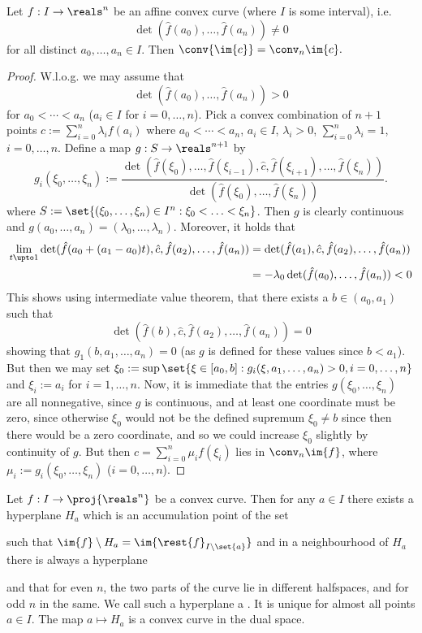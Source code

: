 \begin{lemma}
    Let $f:I\to\reals^n$ be an affine convex curve (where $I$ is some interval), i.e.
    $$
    \det(\hat{f}(a_0),\ldots,\hat{f}(a_n)) \neq 0
    $$
    for all distinct $a_0,\ldots,a_n\in I$. Then $\conv{\im{c}}=\conv_n{\im{c}}.$
\end{lemma}

\begin{proof}
    W.l.o.g. we may assume that
    $$
    \det(\hat{f}(a_0),\ldots,\hat{f}(a_n))>0
    $$
    for $a_0 < \cdots < a_n$ ($a_i\in I$ for $i=0,\ldots,n$).
    Pick a convex combination of $n+1$ points $c:=\sum_{i=0}^n{\lambda_i f(a_i)}$ where $a_0 < \cdots <a_n$, $a_i\in I$, $\lambda_i>0$, $\sum_{i=0}^n{\lambda_i}=1$, $i=0,\ldots,n$. Define a map $g:S\to\reals^{n+1}$ by
        $$ g_i(\xi_0,\ldots,\xi_n):=\frac{\det(\hat{f}(\xi_0),\ldots,\hat{f}(\xi_{i-1}),\hat{c},\hat{f}(\xi_{i+1}),\ldots,\hat{f}(\xi_n))}{\det(\hat{f}(\xi_0),\ldots,\hat{f}(\xi_n))}.
        $$
        where $S:=\set{(\xi_0,\ldots,\xi_n)\in I^n:\xi_0<\ldots<\xi_n}$.
        Then $g$ is clearly continuous and $g(a_0,\ldots,a_n)=(\lambda_0,\ldots,\lambda_n)$.
        Moreover, it holds that
        \begin{align*}
            \lim_{t\upto 1}{\det(\hat{f}(a_0+(a_1-a_0)t),\hat{c},\hat{f}(a_2),\ldots,\hat{f}(a_n))}
            &=\det(\hat{f}(a_1),\hat{c},\hat{f}(a_2),\ldots,\hat{f}(a_n))\\
            &= -\lambda_0\det(\hat{f}(a_0),\ldots,\hat{f}(a_n))<0
        \end{align*}
        This shows using intermediate value theorem, that there exists a $b\in(a_0,a_1)$ such that
        $$\det(\hat{f}(b),\hat{c},\hat{f}(a_2),\ldots,\hat{f}(a_n))=0$$
        showing that $g_1(b,a_1,\ldots,a_n)=0$ (as $g$ is defined for these values since $b<a_1$).
        But then we may set $\xi_0:=\sup\set{\xi\in[a_0,b]:g_i(\xi,a_1,\ldots,a_n) > 0,i=0,\ldots,n}$ and $\xi_i:=a_i$ for $i=1,\ldots,n$.
        Now, it is immediate that the entries $g(\xi_0,\ldots,\xi_n)$ are all nonnegative, since $g$ is continuous, and at least one coordinate must be zero, since otherwise $\xi_0$ would not be the defined supremum $\xi_0\neq b$ since then there would be a zero coordinate, and so we could increase $\xi_0$ slightly by continuity of $g$.
        But then $c=\sum_{i=0}^n{\mu_i f(\xi_i)}$ lies in $\conv_n{\im{f}}$, where $\mu_i:=g_i(\xi_0,\ldots,\xi_n)$ ($i=0,\ldots,n$).
\end{proof}

\begin{lemma}
    Let $f:I\to \proj{\reals^n}$ be a convex curve. Then for any $a\in I$ there exists a hyperplane $H_a$ which is an accumulation point of the set

    such that $\im{f}\setminus H_a=\im{\rest{f}_{I\setminus\set{a}}}$ and in a neighbourhood of $H_a$ there is always a hyperplane 

    and that for even $n$, the two parts of the curve lie in different halfspaces, and for odd $n$ in the same. We call such a hyperplane a .
    It is unique for almost all points $a\in I$. The map $a\mapsto H_a$ is a convex curve in the dual space.
\end{lemma}

